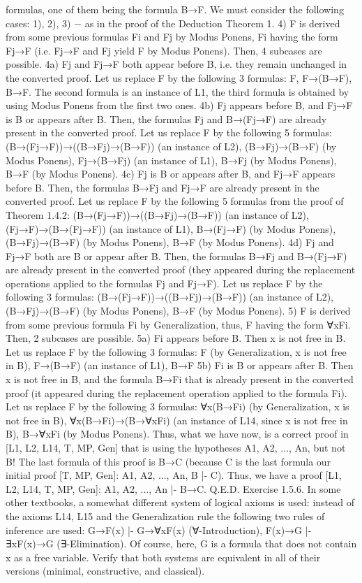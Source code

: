 formulas, one of them being the formula B→F.
We must consider the following cases:
1), 2), 3) − as in the proof of the Deduction Theorem 1.
4) F is derived from some previous formulas Fi and Fj by Modus Ponens, Fi having the form Fj→F (i.e.
Fj→F and Fj yield F by Modus Ponens). Then, 4 subcases are possible.
4a) Fj and Fj→F both appear before B, i.e. they remain unchanged in the converted proof. Let us replace
F by the following 3 formulas: F, F→(B→F), B→F. The second formula is an instance of L1, the third
formula is obtained by using Modus Ponens from the first two ones.
4b) Fj appears before B, and Fj→F is B or appears after B. Then, the formulas Fj and B→(Fj→F) are
already present in the converted proof. Let us replace F by the following 5 formulas:
(B→(Fj→F))→((B→Fj)→(B→F)) (an instance of L2),
(B→Fj)→(B→F) (by Modus Ponens),
Fj→(B→Fj) (an instance of L1),
B→Fj (by Modus Ponens),
B→F (by Modus Ponens).
4c) Fj is B or appears after B, and Fj→F appears before B. Then, the formulas B→Fj and Fj→F are
already present in the converted proof. Let us replace F by the following 5 formulas from the proof of
Theorem 1.4.2:
(B→(Fj→F))→((B→Fj)→(B→F)) (an instance of L2),
(Fj→F)→(B→(Fj→F)) (an instance of L1),
B→(Fj→F) (by Modus Ponens),
(B→Fj)→(B→F) (by Modus Ponens),
B→F (by Modus Ponens).
4d) Fj and Fj→F both are B or appear after B. Then, the formulas B→Fj and B→(Fj→F) are already
present in the converted proof (they appeared during the replacement operations applied to the formulas
Fj and Fj→F). Let us replace F by the following 3 formulas:
(B→(Fj→F))→((B→Fj)→(B→F)) (an instance of L2),
(B→Fj)→(B→F) (by Modus Ponens),
B→F (by Modus Ponens).
5) F is derived from some previous formula Fi by Generalization, thus, F having the form ∀xFi. Then, 2
subcases are possible.
5a) Fi appears before B. Then x is not free in B. Let us replace F by the following 3 formulas:
F (by Generalization, x is not free in B),
F→(B→F) (an instance of L1),
B→F
5b) Fi is B or appears after B. Then x is not free in B, and the formula B→Fi that is already present in the
converted proof (it appeared during the replacement operation applied to the formula Fi). Let us replace F
by the following 3 formulas:
∀x(B→Fi) (by Generalization, x is not free in B),
∀x(B→Fi)→(B→∀xFi) (an instance of L14, since x is not free in B),
B→∀xFi (by Modus Ponens).
Thus, what we have now, is a correct proof in [L1, L2, L14, T, MP, Gen] that is using the hypotheses A1,
A2, ..., An, but not B! The last formula of this proof is B→C (because C is the last formula our initial
proof [T, MP, Gen]: A1, A2, ..., An, B |- C). Thus, we have a proof [L1, L2, L14, T, MP, Gen]: A1, A2, ...,
An |- B→C. Q.E.D.
Exercise 1.5.6. In some other textbooks, a somewhat different system of logical axioms is used: instead
of the axioms L14, L15 and the Generalization rule the following two rules of inference are used:
G→F(x) |- G→∀xF(x) (∀-Introduction),
F(x)→G |- ∃xF(x)→G (∃-Elimination).
Of course, here, G is a formula that does not contain x as a free variable. Verify that both systems are
equivalent in all of their versions (minimal, constructive, and classical).

